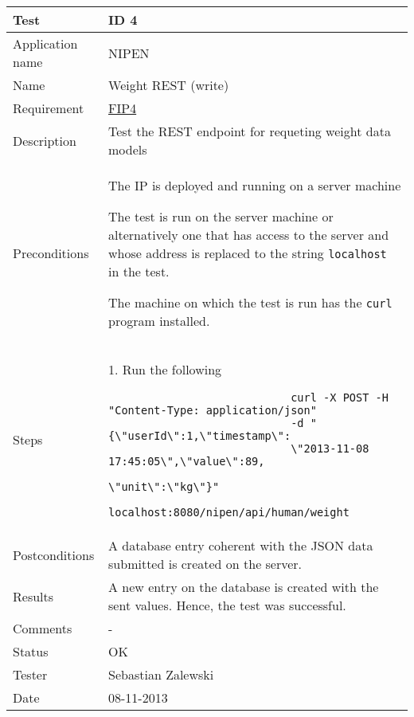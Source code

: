 \begin{table}
\begin{center}
\begin{tabular}{ | l | p{10cm} | }
	\hline
	\textbf{Test}	&	\textbf{ID 4} \\
	\hline\noalign{\smallskip}\noalign{\smallskip}\hline
	Application name	& NIPEN \\
	Name				& Weight REST (write) \\
	Requirement			& \hyperref[table:reqip]{FIP4} \\
	Description			& Test the REST endpoint for requeting weight data models \\
	Preconditions		&	\par The IP is deployed and running on a server machine
							\par The test is run on the server machine or alternatively
							one that has access to the server and whose address is replaced to the
							string \verb|localhost| in the test.
							\par The machine on which the test is run has the \verb|curl| program installed. \\
	Steps 				&	1. Run the following \begin{verbatim}
							curl -X POST -H "Content-Type: application/json" 
							-d "{\"userId\":1,\"timestamp\":
							\"2013-11-08 17:45:05\",\"value\":89,
							\"unit\":\"kg\"}" 
							localhost:8080/nipen/api/human/weight
							\end{verbatim} \\
	Postconditions		& A database entry coherent with the JSON data submitted is created on the server. \\
	Results				& A new entry on the database is created with the sent values.
						  Hence, the test was successful. \\
	Comments			& - \\
	Status				& OK \\
	Tester				& Sebastian Zalewski \\
	Date				& 08-11-2013 \\
	\hline
\end{tabular}
\end{center}
\end{table}

